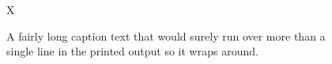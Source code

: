 \documentclass{article}
\begin{document}
\begin{figure}\centering X\caption{A fairly long caption text that would surely run over more than a single line in the printed output so it wraps around.}\end{figure}
\end{document}
